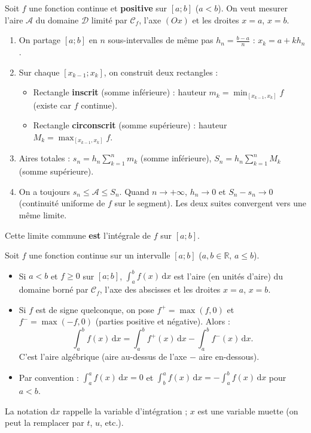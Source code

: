 \documentclass[11pt]{article}
\newcommand{\cle}[1]{{\popxbold\color{popdark}#1}}
\begin{document}
\begin{experience}
Soit $f$ une fonction continue et \textbf{positive} sur $[a;b]$ ($a<b$). On veut mesurer l'aire $\mathcal{A}$ du domaine $\mathcal{D}$ limité par $\mathcal{C}_f$, l'axe $(Ox)$ et les droites $x=a$, $x=b$.
\begin{enumerate}
  \item On partage $[a;b]$ en $n$ sous-intervalles de même pas $h_n=\frac{b-a}{n}$ : $x_k=a+kh_n$.
  \item Sur chaque $[x_{k-1};x_k]$, on construit deux rectangles :
  \begin{itemize}
    \item Rectangle \textbf{inscrit} (somme inférieure) : hauteur $m_k = \min_{[x_{k-1},x_k]} f$ (existe car $f$ continue).
    \item Rectangle \textbf{circonscrit} (somme supérieure) : hauteur $M_k = \max_{[x_{k-1},x_k]} f$.
  \end{itemize}
  \item Aires totales : $s_n = h_n\sum_{k=1}^n m_k$ (somme inférieure), $S_n = h_n\sum_{k=1}^n M_k$ (somme supérieure).
  \item On a toujours $s_n \le \mathcal{A} \le S_n$. Quand $n\to +\infty$, $h_n\to 0$ et $S_n-s_n \to 0$ (continuité uniforme de $f$ sur le segment). Les deux suites convergent vers une même limite.
\end{enumerate}
Cette limite commune \textbf{est} l'intégrale de $f$ sur $[a;b]$.
\end{experience}

\begin{definition}
Soit $f$ une fonction continue sur un intervalle $[a;b]$ ($a,b\in\mathbb{R}$, $a\le b$).
\begin{itemize}
  \item Si $a<b$ et $f\ge 0$ sur $[a;b]$, $\displaystyle\int_a^b f(x)\,\mathrm{d}x$ est l'\cle{aire} (en unités d'aire) du domaine borné par $\mathcal{C}_f$, l'axe des abscisses et les droites $x=a$, $x=b$.
  \item Si $f$ est de signe quelconque, on pose $f^+=\max(f,0)$ et $f^-=\max(-f,0)$ (parties positive et négative). Alors :
  \[
  \int_a^b f(x)\,\mathrm{d}x = \int_a^b f^+(x)\,\mathrm{d}x - \int_a^b f^-(x)\,\mathrm{d}x.
  \]
  C'est l'\cle{aire algébrique} (aire au-dessus de l'axe $-$ aire en-dessous).
  \item Par convention : $\displaystyle\int_a^a f(x)\,\mathrm{d}x = 0$ et $\displaystyle\int_b^a f(x)\,\mathrm{d}x = -\int_a^b f(x)\,\mathrm{d}x$ pour $a<b$.
\end{itemize}
La notation $\mathrm{d}x$ rappelle la variable d'intégration ; $x$ est une \cle{variable muette} (on peut la remplacer par $t$, $u$, etc.).
\end{definition}
\end{document}
